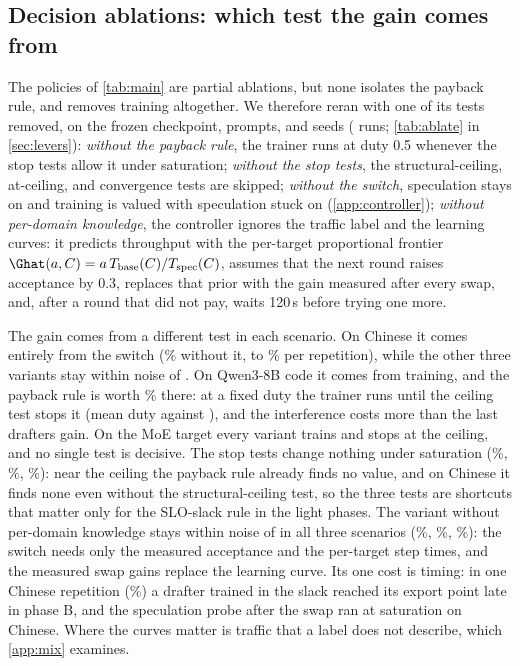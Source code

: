 \subsection{Decision ablations: which test the gain comes from}\label{app:ablation}

The policies of \cref{tab:main} are partial ablations, but none isolates the payback rule, and  removes training altogether. We therefore reran  with one of its tests removed, on the frozen checkpoint, prompts, and seeds ( runs; \cref{tab:ablate} in \cref{sec:levers}): \emph{without the payback rule}, the trainer runs at duty 0.5 whenever the stop tests allow it under saturation; \emph{without the stop tests}, the structural-ceiling, at-ceiling, and convergence tests are skipped; \emph{without the switch}, speculation stays on and training is valued with speculation stuck on (\cref{app:controller}); \emph{without per-domain knowledge}, the controller ignores the traffic label and the learning curves: it predicts throughput with the per-target proportional frontier $\Ghat(a,C)=a\,T_{\mathrm{base}}(C)/T_{\mathrm{spec}}(C)$, assumes that the next round raises acceptance by 0.3, replaces that prior with the gain measured after every swap, and, after a round that did not pay, waits 120\,s before trying one more.

The gain comes from a different test in each scenario. On Chinese it comes entirely from the switch (\% without it,  to \% per repetition), while the other three variants stay within noise of . On Qwen3-8B code it comes from training, and the payback rule is worth \% there: at a fixed duty the trainer runs until the ceiling test stops it (mean duty  against ), and the interference costs more than the last drafters gain. On the MoE target every variant trains and stops at the ceiling, and no single test is decisive. The stop tests change nothing under saturation (\%, \%, \%): near the ceiling the payback rule already finds no value, and on Chinese it finds none even without the structural-ceiling test, so the three tests are shortcuts that matter only for the SLO-slack rule in the light phases. The variant without per-domain knowledge stays within noise of  in all three scenarios (\%, \%, \%): the switch needs only the measured acceptance and the per-target step times, and the measured swap gains replace the learning curve. Its one cost is timing: in one Chinese repetition (\%) a drafter trained in the slack reached its export point late in phase B, and the speculation probe after the swap ran at saturation on Chinese. Where the curves matter is traffic that a label does not describe, which \cref{app:mix} examines.
